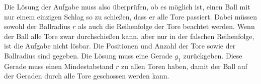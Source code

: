 Die Lösung der Aufgabe muss also überprüfen, ob es möglich ist, einen Ball mit nur einem einzigen Schlag so zu schießen, dass er alle Tore passiert. Dabei müssen sowohl der Ballradius $r$ als auch die Reihenfolge der Tore beachtet werden. Wenn der Ball alle Tore zwar durchschießen kann, aber nur in der falschen Reihenfolge, ist die Aufgabe nicht lösbar. Die Positionen und Anzahl der Tore sowie der Ballradius sind gegeben. Die Lösung muss eine Gerade $g_1$ zurückgeben. Diese Gerade muss einen Mindestabstand $r$ zu allen Toren haben, damit der Ball auf der Geraden durch alle Tore geschossen werden kann.